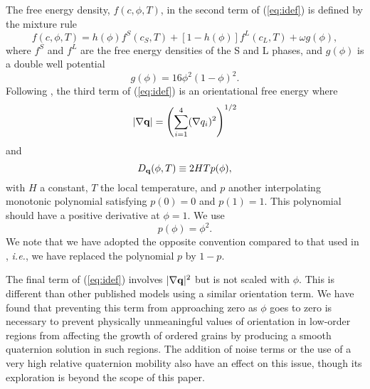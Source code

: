 %
The free energy density, $f(c,\phi,T)$, in the
second term of (\ref{eq:idef}) is defined by the mixture rule
%
\begin{equation}
  f(c,\phi,T)=h(\phi)f^S(c_S,T)+[1-h(\phi)]f^L(c_L,T)+\omega g(\phi),
\label{eq:fmix}
\end{equation}
%
where $f^S$ and $f^L$ are the free energy densities of the S and L
phases, and $g(\phi)$ is a double well potential
%
\begin{equation}
  g(\phi)=16 \phi^2(1-\phi)^2.
\label{eq:dwell}
\end{equation}
%
Following \cite{0295-5075-71-1-131}, the third term of (\ref{eq:idef})
is an orientational free energy where
%
\begin{equation}
  | \nabla {\bf q} | = \left ( \sum_{i=1}^4 (\nabla q_i)^2 \right )^{1/2}
\end{equation}
%
and
%
\begin{equation}
  D_{\bf q} (\phi,T) \equiv 2HTp(\phi),
\label{eq:dqdef}
\end{equation}
%
with $H$ a constant, $T$ the local temperature, and $p$ another
interpolating monotonic polynomial satisfying $p(0)=0$ and $p(1)=1$.
This polynomial should have a positive derivative at $\phi=1$. We use
%
\begin{equation}
  p(\phi) = \phi^2.
\end{equation}
%
We note that we have adopted the opposite convention compared to that
used in \cite{0295-5075-71-1-131}, {\em i.e.}, we have replaced the
polynomial $p$ by $1-p$.

The final term of (\ref{eq:idef}) involves $|\nabla {\bf q} |^2$ but
is not scaled with $\phi$.  This is different than other published
models using a similar orientation term.  We have found that
preventing this term from approaching zero as $\phi$ goes to zero is
necessary to prevent physically unmeaningful values of orientation in
low-order regions from affecting the growth of ordered grains by
producing a smooth quaternion solution in such regions.  The addition
of noise terms or the use of a very high relative quaternion mobility
also have an effect on this issue, though its exploration is beyond
the scope of this paper.

